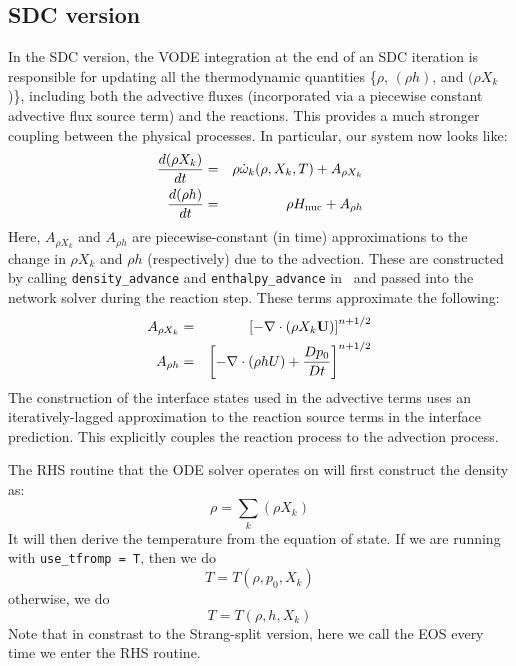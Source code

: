 \subsection{SDC version}
In the SDC version, the VODE integration at the end of an SDC
iteration is responsible for updating all the thermodynamic quantities
\{$\rho$, $(\rho h)$, and $(\rho X_k$)\}, including both the advective
fluxes (incorporated via a piecewise constant advective flux source
term) and the reactions.  This provides a much stronger coupling between
the physical processes.  In particular, our system now looks like:
\begin{eqnarray}
\frac{d(\rho X_k)}{dt} &=& \rho \dot{\omega}_k(\rho,X_k,T) + A_{\rho X_k} \\
\frac{d(\rho h)}{dt}   &=& \rho {H_{\rm nuc}} + A_{\rho h}
\end{eqnarray}
Here, $A_{\rho X_k}$ and $A_{\rho h}$ are piecewise-constant (in time)
approximations to the change in ${\rho X_k}$ and ${\rho h}$ (respectively)
due to the advection.  These are constructed by calling {\tt density\_advance}
and {\tt enthalpy\_advance} in \maestro\ and passed into the network solver
during the reaction step.  These terms approximate the following:
\begin{eqnarray}
A_{\rho X_k} &=&  \left [- \nabla \cdot (\rho X_k {\bf U}) \right ]^{n+1/2} \\
A_{\rho h}   &=&  \left [- \nabla \cdot (\rho h U) + \frac{Dp_0}{Dt} \right ]^{n+1/2}
\end{eqnarray}
The construction of the interface states used in the advective terms
uses an iteratively-lagged approximation to the reaction source terms
in the interface prediction.  This explicitly couples the reaction
process to the advection process.

The RHS routine that the ODE solver operates on will first construct
the density as:
\begin{equation}
\rho = \sum_k (\rho X_k)
\end{equation}
It will then derive the temperature from the equation of state.  If we
are running with {\tt use\_tfromp = T}, then we do
\begin{equation}
T = T(\rho, p_0, X_k)
\end{equation}
otherwise, we do
\begin{equation}
T = T(\rho, h, X_k)
\end{equation}
Note that in constrast to the Strang-split version, here we call the EOS
every time we enter the RHS routine.

